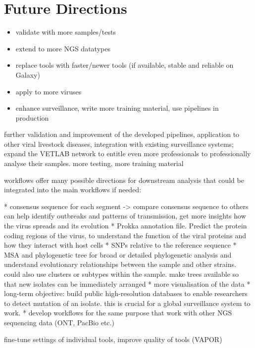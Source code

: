 \section{Future Directions}
\todoit
\begin{itemize}
    \item validate with more samples/tests
    \item extend to more NGS datatypes
    \item replace tools with faster/newer tools (if available, stable and reliable on Galaxy)
    \item apply to more viruses
    \item enhance surveillance, write more training material, use pipelines in production
\end{itemize}

further validation and improvement of the developed pipelines, application to other viral livestock diseases, integration with existing surveillance systems; expand the \ac{VETLAB} network to entitle even more professionals to professionally analyse their samples.
more testing, more training material

workflows offer many possible directions for downstream analysis that could be integrated into the main workflows if needed:

* consensus sequence for each segment -> compare consensus sequence to others can help identify outbreaks and patterns of transmission, get more insights how the virus spreads and its evolution
* Prokka annotation file. Predict the protein coding regions of the virus, to understand the function of the viral proteins and how they interact with host cells
* SNPs relative to the reference sequence
* \ac{MSA} and phylogenetic tree for broad or detailed phylogenetic analysis and understand evolutionary relationships between the sample and other strains. could also use clusters or subtypes within the sample. make trees available so that new isolates can be immediately arranged
* more visualisation of the data
* long-term objective: build public high-resolution databases to enable researchers to detect mutation of an isolate. this is crucial for a global surveillance system to work.
* develop workflows for the same purpose that work with other NGS sequencing data (ONT, PacBio etc.)

fine-tune settings of individual tools, improve quality of tools (VAPOR)